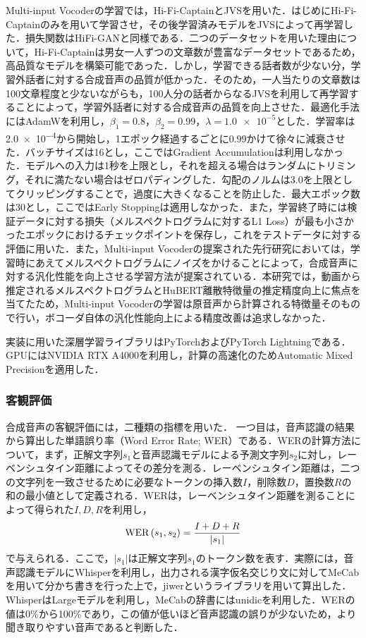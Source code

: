 \documentclass[12pt]{jarticle}
\numberwithin{equation}{section}    %
\numberwithin{figure}{section}      %
\numberwithin{table}{section}      %
\begin{document}
Multi-input Vocoderの学習では，Hi-Fi-CaptainとJVSを用いた．はじめにHi-Fi-Captainのみを用いて学習させ，その後学習済みモデルをJVSによって再学習した．損失関数はHiFi-GANと同様である．二つのデータセットを用いた理由について，Hi-Fi-Captainは男女一人ずつの文章数が豊富なデータセットであるため，高品質なモデルを構築可能であった．しかし，学習できる話者数が少ない分，学習外話者に対する合成音声の品質が低かった．そのため，一人当たりの文章数は100文章程度と少ないながらも，100人分の話者からなるJVSを利用して再学習することによって，学習外話者に対する合成音声の品質を向上させた．最適化手法にはAdamWを利用し，$\beta_{1} = 0.8$，$\beta_{2} = 0.99$，$\lambda = \num{1.0e-5}$とした．学習率は\num{2.0e-4}から開始し，1エポック経過するごとに0.99かけて徐々に減衰させた．バッチサイズは16とし，ここではGradient Accumulationは利用しなかった．モデルへの入力は1秒を上限とし，それを超える場合はランダムにトリミング，それに満たない場合はゼロパディングした．勾配のノルムは3.0を上限としてクリッピングすることで，過度に大きくなることを防止した．最大エポック数は30とし，ここではEarly Stoppingは適用しなかった．また，学習終了時には検証データに対する損失（メルスペクトログラムに対するL1 Loss）が最も小さかったエポックにおけるチェックポイントを保存し，これをテストデータに対する評価に用いた．また，Multi-input Vocoderの提案された先行研究\cite{choi2023intelligible}においては，学習時にあえてメルスペクトログラムにノイズをかけることによって，合成音声に対する汎化性能を向上させる学習方法が提案されている．本研究では，動画から推定されるメルスペクトログラムとHuBERT離散特徴量の推定精度向上に焦点を当てたため，Multi-input Vocoderの学習は原音声から計算される特徴量そのもので行い，ボコーダ自体の汎化性能向上による精度改善は追求しなかった．

実装に用いた深層学習ライブラリはPyTorchおよびPyTorch Lightningである．GPUにはNVIDIA RTX A4000を利用し，計算の高速化のためAutomatic Mixed Precisionを適用した．

\subsubsection{客観評価}
合成音声の客観評価には，二種類の指標を用いた．
一つ目は，音声認識の結果から算出した単語誤り率（Word Error Rate; WER）である．WERの計算方法について，まず，正解文字列$s_{1}$と音声認識モデルによる予測文字列$s_{2}$に対し，レーベンシュタイン距離によってその差分を測る．レーベンシュタイン距離は，二つの文字列を一致させるために必要なトークンの挿入数$I$，削除数$D$，置換数$R$の和の最小値として定義される．WERは，レーベンシュタイン距離を測ることによって得られた$I, D, R$を利用し，
\begin{equation}
    \text{WER}\left(s_{1}, s_{2}\right) = \frac{I + D + R}{|s_{1}|}
\end{equation}
で与えられる．ここで，$|s_{1}|$は正解文字列$s_{1}$のトークン数を表す．実際には，音声認識モデルにWhisper\cite{radford2023robust}を利用し，出力される漢字仮名交じり文に対してMeCabを用いて分かち書きを行った上で，jiwerというライブラリを用いて算出した．WhisperはLargeモデルを利用し，MeCabの辞書にはunidicを利用した．WERの値は0\%から100\%であり，この値が低いほど音声認識の誤りが少ないため，より聞き取りやすい音声であると判断した．
\end{document}
